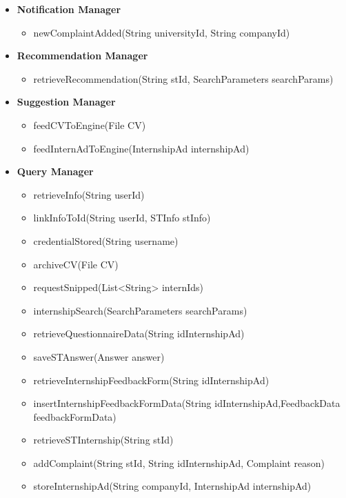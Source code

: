 \begin{itemize}
      \item \textbf{Notification Manager}
            \begin{itemize}
                  \item newComplaintAdded(String universityId, String companyId)
            \end{itemize}

      \item \textbf{Recommendation Manager}
            \begin{itemize}
                  \item retrieveRecommendation(String stId, SearchParameters searchParams)
            \end{itemize}

      \item \textbf{Suggestion Manager}
            \begin{itemize}
                  \item feedCVToEngine(File CV)
                  \item feedInternAdToEngine(InternshipAd internshipAd)
            \end{itemize}

      \item \textbf{Query Manager}
            \begin{itemize}
                  \item retrieveInfo(String userId)
                  \item linkInfoToId(String userId, STInfo stInfo)
                  \item credentialStored(String username)
                  \item archiveCV(File CV)
                  \item requestSnipped(List<String> internIds)
                  \item internshipSearch(SearchParameters searchParams)
                  \item retrieveQuestionnaireData(String idInternshipAd)
                  \item saveSTAnswer(Answer answer)
                  \item retrieveInternshipFeedbackForm(String idInternshipAd)
                  \item insertInternshipFeedbackFormData(String idInternshipAd,FeedbackData feedbackFormData)
                  \item retrieveSTInternship(String stId)
                  \item addComplaint(String stId, String idInternshipAd, Complaint reason)
                  \item storeInternshipAd(String companyId, InternshipAd internshipAd)
            \end{itemize}


\end{itemize}
